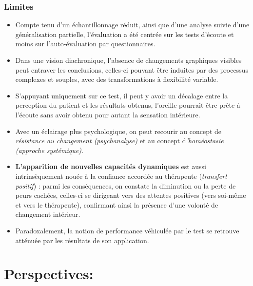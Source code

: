 




\subsection{Limites}


\begin{itemize}

\item Compte tenu  d'un échantillonnage réduit, ainsi que d'une analyse
suivie d'une généralisation partielle, l'évaluation a été centrée sur les
tests d'écoute et moins sur
l'auto-évaluation par questionnaires.

\item   Dans une vision diachronique, l'absence de changements graphiques
visibles
peut  entraver les conclusions, celles-ci pouvant être
induites par des processus complexes et souples, avec des
transformations à flexibilité variable.
\item S'appuyant uniquement sur ce test, il peut y avoir un décalage entre
la perception du patient et les résultats obtenus, l'oreille pourrait
être prête à l'écoute sans avoir obtenu pour autant la sensation intérieure.


\item Avec un éclairage plus psychologique, on peut recourir au concept de
\textit{résistance au changement (psychanalyse)} et au concept
d\textit{'homéostasie (approche systémique)}.

\item \textbf{L'apparition de nouvelles
capacités  dynamiques }est aussi intrinsèquement nouée à la confiance
accordée au thérapeute (\textit{transfert positif})
\autocite{roustang1986} : parmi les conséquences, on constate la
diminution ou la perte de peurs cachées, celles-ci se dirigeant vers des
attentes positives (vers soi-même et vers le thérapeute), confirmant ainsi la
présence d'une volonté de changement intérieur.

\item Paradoxalement, la notion de performance véhiculée par le test se
retrouve atténuée par les résultats de son application.
\end{itemize}



\chapter{Perspectives:}


